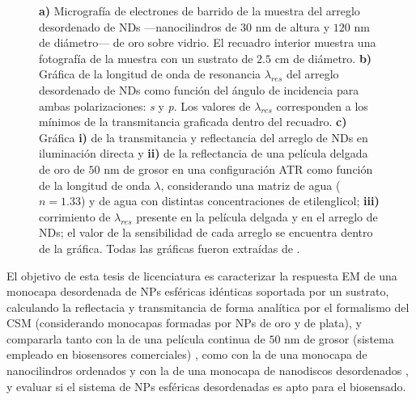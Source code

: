 \begin{figure}[t!]
		\caption{ \textbf{a)} Micrografía de electrones de barrido de la muestra del arreglo desordenado de NDs ---nanocilindros de $30$ nm de altura y  $120$ nm de diámetro--- de oro sobre vidrio. El recuadro interior muestra una fotografía de la muestra con un sustrato de $2.5$ cm de diámetro. \textbf{b)} Gráfica de la longitud de onda de resonancia $\lambda_{res}$ del arreglo desordenado de NDs como función del ángulo de incidencia para ambas polarizaciones: \emph{s} y \emph{p}. Los valores de $\lambda_{res}$ corresponden a los mínimos de la transmitancia graficada dentro del recuadro. \textbf{c)} Gráfica \textbf{i)} de la transmitancia y reflectancia del arreglo de NDs en iluminación directa y \textbf{ii)} de la reflectancia de una película delgada de oro de $50$ nm de grosor en una configuración ATR como función de la longitud de onda $\lambda$, considerando una matriz de agua ($n=1.33$) y de agua con distintas concentraciones  de etilenglicol; \textbf{iii)} corrimiento de $\lambda_{res}$ presente en la película delgada y en el arreglo de NDs; el valor de la sensibilidad de cada arreglo se encuentra dentro de la gráfica. Todas las gráficas fueron extraídas de \cite{svedendahl2009refractometric}.}\label{fig:GraphsPapersNANODISKS}
	\end{figure} 
 
El objetivo de esta tesis de licenciatura es caracterizar la respuesta EM de una monocapa desordenada de NPs esféricas idénticas soportada por un sustrato, calculando la reflectacia y transmitancia de forma analítica por el formalismo del CSM (considerando monocapas formadas por NPs de oro y de plata), y compararla tanto con la de una película continua de $50$ nm de grosor (sistema empleado en biosensores comerciales) \cite{svedendahl2009refractometric}, como con la de una monocapa de nanocilindros ordenados \cite{kabashin2009plasmonic,danilov2018ultra} y con la de una monocapa de nanodiscos desordenados \cite{svedendahl2009refractometric}, y evaluar si el sistema de NPs esféricas desordenadas es apto para el biosensado.

